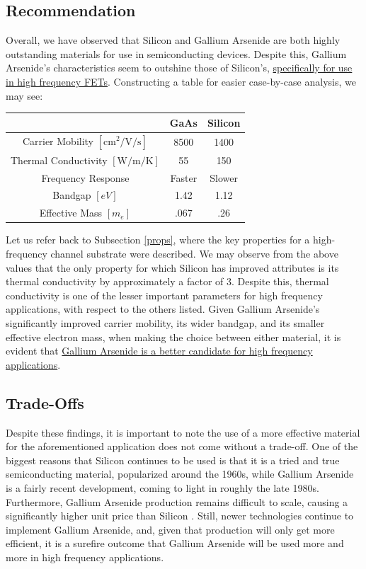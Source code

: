 \documentclass[conference]{IEEEtran}
\begin{document}
\subsection{Recommendation}

Overall, we have observed that Silicon and Gallium Arsenide are both highly outstanding materials for use in semiconducting devices. Despite this, Gallium Arsenide's characteristics seem to outshine those of Silicon's, \underline{specifically for use in high frequency FETs}. Constructing a table for easier case-by-case analysis, we may see:

\begin{center}
  \begin{tabular}[H]{|c|c|c|}
    \hline
    & GaAs & Silicon\\
    \hline
    Carrier Mobility $[\si{\centi\meter\squared\per\volt\per\second}]$ & 8500 & 1400\\
    \hline
    Thermal Conductivity $[\si{\watt\per\meter\per\kelvin}]$ & 55 & 150\\
    \hline
    Frequency Response & Faster & Slower\\
    \hline
    Bandgap $[\si{eV}]$ & 1.42 & 1.12\\
    \hline
    Effective Mass $[m_e]$ & .067 & .26\\
    \hline
  \end{tabular}
\end{center}

Let us refer back to Subsection \ref{props}, where the key properties for a high-frequency channel substrate were described. We may observe from the above values that the only property for which Silicon has improved attributes is its thermal conductivity by approximately a factor of 3. Despite this, thermal conductivity is one of the lesser important parameters for high frequency applications, with respect to the others listed. Given Gallium Arsenide's significantly improved carrier mobility, its wider bandgap, and its smaller effective electron mass, when making the choice between either material, it is evident that \underline{Gallium Arsenide is a better candidate for high frequency} \underline{applications}.

\subsection{Trade-Offs}

Despite these findings, it is important to note the use of a more effective material for the aforementioned application does not come without a trade-off. One of the biggest reasons that Silicon continues to be used is that it is a tried and true semiconducting material, popularized around the 1960s, while Gallium Arsenide is a fairly recent development, coming to light in roughly the late 1980s. Furthermore, Gallium Arsenide production remains difficult to scale, causing a significantly higher unit price than Silicon \cite{cost}. Still, newer technologies continue to implement Gallium Arsenide, and, given that production will only get more efficient, it is a surefire outcome that Gallium Arsenide will be used more and more in high frequency applications.
\end{document}
